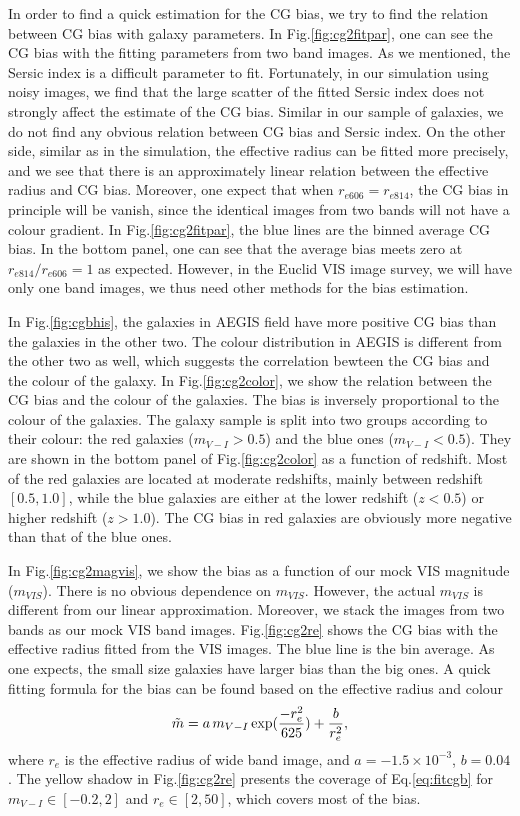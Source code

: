 \documentclass[useAMS,usenatbib]{mn2e}
\newcommand{\be}{\begin{equation}}
\newcommand{\ee}{\end{equation}}
\def\elabel#1{\label{eq:#1}}
\begin{document}
%
In order to find a quick estimation for the CG bias, we try to find
the relation between CG bias with galaxy parameters. In
Fig.\ref{fig:cg2fitpar}, one can see the CG bias with the fitting
parameters from two band images. As we mentioned, the Sersic index is
a difficult parameter to fit. Fortunately, in our simulation using
noisy images, we find that the large scatter of the fitted Sersic
index does not strongly affect the estimate of the CG bias. Similar in
our sample of galaxies, we do not find any obvious relation between CG
bias and Sersic index. On the other side, similar as in the
simulation, the effective radius can be fitted more precisely, and we
see that there is an approximately linear relation between the effective
radius and CG bias.  Moreover, one expect that when
$r_{e606}=r_{e814}$, the CG bias in principle will be vanish, since
the identical images from two bands will not have a colour gradient. In
Fig.\ref{fig:cg2fitpar}, the blue lines are the binned average CG
bias. In the bottom panel, one can see that the average bias meets
zero at $r_{e814}/r_{e606}=1$ as expected. However, in the Euclid VIS
image survey, we will have only one band images, we thus need other
methods for the bias estimation.


In Fig.\ref{fig:cgbhis}, the galaxies in AEGIS field have more
positive CG bias than the galaxies in the other two. The colour
distribution in AEGIS is different from the other two as well, which
suggests the correlation bewteen the CG bias and the colour of the
galaxy. In Fig.\ref{fig:cg2color}, we show the relation between the
CG bias and the colour of the galaxies. The bias is inversely
proportional to the colour of the galaxies. The galaxy sample is split
into two groups according to their colour: the red galaxies
($m_{V-I}>0.5$) and the blue ones ($m_{V-I}<0.5$). They are shown
in the bottom panel of Fig.\ref{fig:cg2color} as a function of
redshift. Most of the red galaxies are located at moderate redshifts,
mainly between redshift $[0.5,1.0]$, while the blue galaxies are
either at the lower redshift ($z<0.5$) or higher redshift
($z>1.0$). The CG bias in red galaxies are obviously more negative
than that of the blue ones.

In Fig.\ref{fig:cg2magvis}, we show the bias as a function of our mock VIS
magnitude ($m_{VIS}$). There is no obvious dependence on $m_{VIS}$. However,
the actual $m_{VIS}$ is different from our linear approximation.
Moreover, we stack the images from two bands as our mock VIS band images.
Fig.\ref{fig:cg2re} shows the CG bias with the effective radius fitted
from the VIS images. The blue line is the bin average. As one
expects, the small size galaxies have larger bias than the big
ones. A quick fitting formula for the bias can be found based on the
effective radius and colour
%
\be
\tilde{m} = a\, m_{V-I}\,{\rm exp}({-r_e^2 \over 625}) +{b \over r_e^2},
\elabel{fitcgb}
\ee
%
where $r_e$ is the effective radius of wide band image, and
$a=-1.5\times 10^{-3}$, $b=0.04$. The yellow shadow in
Fig.\ref{fig:cg2re} presents the coverage of Eq.\ref{eq:fitcgb} for
$m_{V-I}\in [-0.2,2]$ and $r_e\in [2,50]$, which covers most of the
bias.
\end{document}
